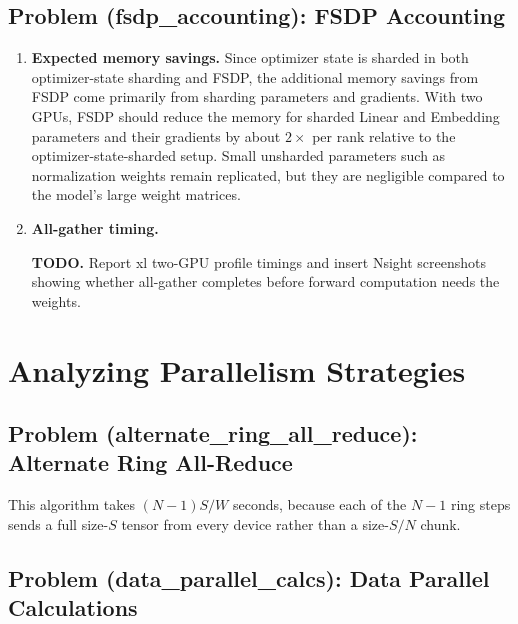 \documentclass[11pt]{article}
\newcommand{\todoanswer}[1]{%
  \par\smallskip
  \noindent\colorbox{yellow!18}{%
    \parbox{\dimexpr\linewidth-2\fboxsep\relax}{\textbf{TODO.} #1}%
  }%
  \par\smallskip
}
\begin{document}
\subsection{Problem (fsdp\_accounting): FSDP Accounting}

\begin{enumerate}
  \item \textbf{Expected memory savings.}
  Since optimizer state is sharded in both optimizer-state sharding and FSDP, the additional memory savings from FSDP come primarily from sharding parameters and gradients. With two GPUs, FSDP should reduce the memory for sharded Linear and Embedding parameters and their gradients by about $2\times$ per rank relative to the optimizer-state-sharded setup. Small unsharded parameters such as normalization weights remain replicated, but they are negligible compared to the model's large weight matrices.

  \item \textbf{All-gather timing.}
  \todoanswer{Report xl two-GPU profile timings and insert Nsight screenshots showing whether all-gather completes before forward computation needs the weights.}
\end{enumerate}

\section{Analyzing Parallelism Strategies}

\subsection{Problem (alternate\_ring\_all\_reduce): Alternate Ring All-Reduce}

This algorithm takes $(N-1)S/W$ seconds, because each of the $N-1$ ring steps sends a full size-$S$ tensor from every device rather than a size-$S/N$ chunk.

\subsection{Problem (data\_parallel\_calcs): Data Parallel Calculations}
\end{document}
